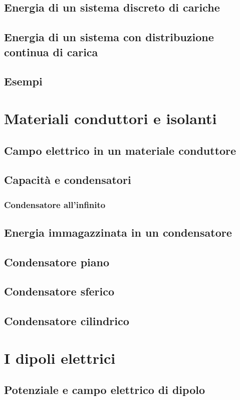 \documentclass{book}
\begin{document}
\section{Energia di un sistema discreto di cariche}
\section{Energia di un sistema con distribuzione continua di carica}
\section{Esempi}

\chapter{Materiali conduttori e isolanti}
\section{Campo elettrico in un materiale conduttore}
\section{Capacit\`a e condensatori}
\subsection{Condensatore all'infinito}
\section{Energia immagazzinata in un condensatore}
\section{Condensatore piano}
\section{Condensatore sferico}
\section{Condensatore cilindrico}

\chapter{I dipoli elettrici}
\section{Potenziale e campo elettrico di dipolo}
\end{document}
